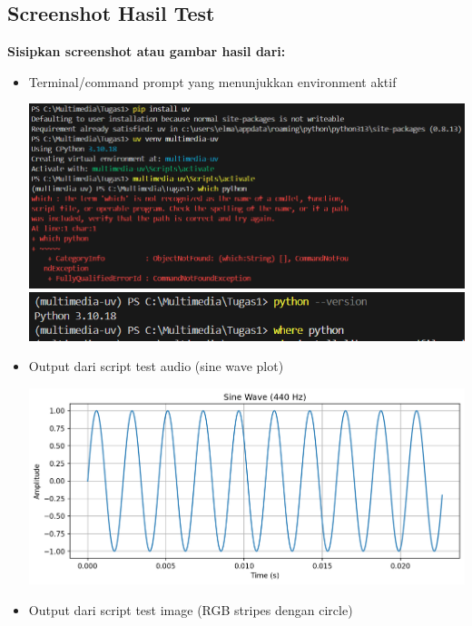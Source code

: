 \documentclass[11pt,a4paper]{article}
\begin{document}
\subsection{Screenshot Hasil Test}
\textbf{Sisipkan screenshot atau gambar hasil dari:}
\begin{itemize}
    \item Terminal/command prompt yang menunjukkan environment aktif
    \begin{center}
	\includegraphics[scale = 0.5]{Figure/Screenshot 2025-08-28 185613.png}
    \includegraphics[scale = 0.8]{Figure/Screenshot 2025-08-28 190314.png}
	\vspace{0.1cm}
    \end{center}
    \item Output dari script test audio (sine wave plot)
    \begin{center}
	\includegraphics[scale = 0.5]{Figure/sine_wave_test.png}
    \end{center}
    \item Output dari script test image (RGB stripes dengan circle)
    \begin{center}

\end{center}
\end{itemize}
\end{document}
